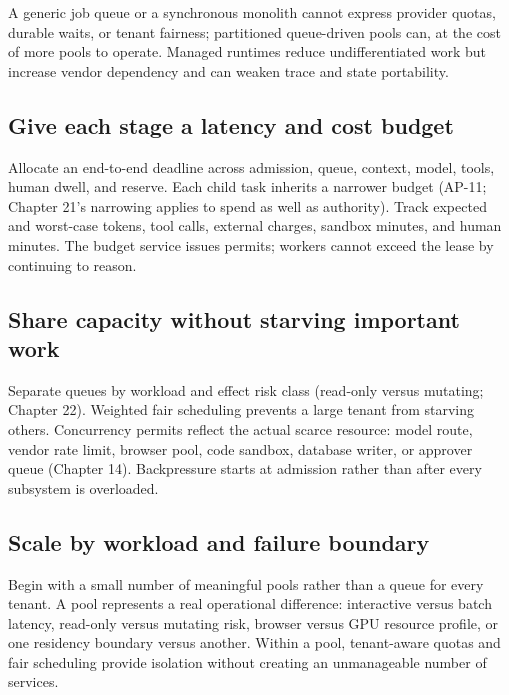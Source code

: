 A generic job queue or a synchronous monolith cannot express provider quotas, durable waits, or tenant fairness; partitioned queue-driven pools can, at the cost of more pools to operate. Managed runtimes reduce undifferentiated work but increase vendor dependency and can weaken trace and state portability.\par

\subsection{Give each stage a latency and cost budget}

Allocate an end-to-end deadline across admission, queue, context, model, tools, human dwell, and reserve. Each child task inherits a narrower budget (AP-11; Chapter 21's narrowing applies to spend as well as authority). Track expected and worst-case tokens, tool calls, external charges, sandbox minutes, and human minutes. The budget service issues permits; workers cannot exceed the lease by continuing to reason.\par

\subsection{Share capacity without starving important work}

Separate queues by workload and effect risk class (read-only versus mutating; Chapter 22). Weighted fair scheduling prevents a large tenant from starving others. Concurrency permits reflect the actual scarce resource: model route, vendor rate limit, browser pool, code sandbox, database writer, or approver queue (Chapter 14). Backpressure starts at admission rather than after every subsystem is overloaded.\par

\subsection{Scale by workload and failure boundary}

Begin with a small number of meaningful pools rather than a queue for every tenant. A pool represents a real operational difference: interactive versus batch latency, read-only versus mutating risk, browser versus GPU resource profile, or one residency boundary versus another. Within a pool, tenant-aware quotas and fair scheduling provide isolation without creating an unmanageable number of services.\par


